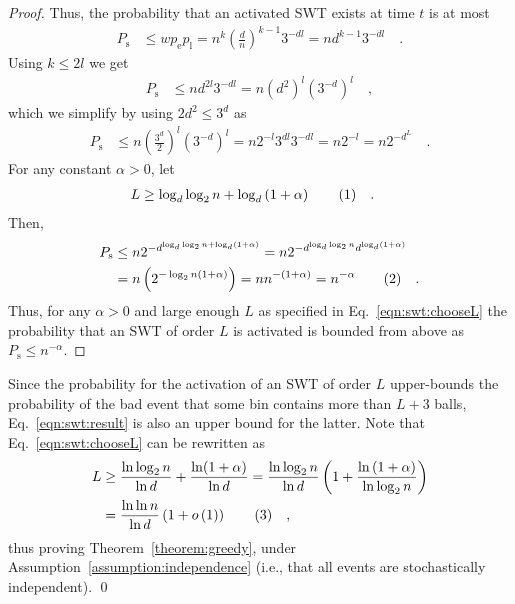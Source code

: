 \documentclass[a4paper,12pt]{article}
\newcommand\numberthis{\addtocounter{equation}{1}\tag{\theequation}}
\newcommand\neqn[1]{\numberthis\label{eqn:#1}}
\begin{document}
\begin{proof}
Thus, the probability that an activated SWT exists at time $t$ is at most 
\begin{align*}
P_\mathrm{s} &\leq w  p_\mathrm{e}  p_\mathrm{l} 
		= n^{k}  \left(\frac{d}{n}\right)^{k-1}  3^{-d  l} 
		= n  d^{k-1}  3^{-d  l}\quad .
\end{align*}
Using $k \leq 2l$ we get
\begin{align*}
P_\mathrm{s} &\leq n  d^{2 l}  3^{-d  l} 
		= n  \left(d^2\right)^l  \left( 3^{-d} \right)^l\quad ,
\end{align*}
which we simplify by using $2d^2 \leq 3^d$ as
\begin{align*}
P_\mathrm{s} &\leq n  \left(\frac{3^d}{2}\right)^l  \left( 3^{-d}\right)^l 
		= n  2^{-l}  3^{d l}  3^{-d  l} 
		= n 2^{-l}		
		= n 2^{-d^L} \quad .		
\end{align*}
For any constant $\alpha > 0 $, let
\begin{align*}
L &\geq \log_d\log_2 n + \log_d\left(1+\alpha\right) \neqn{swt:chooseL} \quad .
\end{align*}
Then, 
\begin{align*}
P_\mathrm{s} &\leq n  2^{{-d}^{\log_d\log_2 n + \log_d\left(1+\alpha\right)}} 
		= n  2^{-{d}^{\log_d\log_2 n} d^{\log_d \left(1+\alpha\right)}} \\
		&= n  \left( 2^{-\log_2 n  \left(1+ \alpha \right)} \right) 
		= n  n^{-\left(1+\alpha\right)} = n^{-\alpha} \neqn{swt:result}\quad .
\end{align*}
Thus, for any $\alpha>0$ and large enough $L$ as specified in Eq.~\ref{eqn:swt:chooseL} the probability that an SWT of order $L$ is activated is bounded from above as $P_\mathrm{s}\leq n^{-\alpha}$.
\end{proof}

Since the probability for the activation of an SWT of order $L$ upper-bounds the probability of the bad event that some bin contains more than $L+3$ balls, Eq.~\ref{eqn:swt:result} is also an upper bound for the latter. Note that Eq.~\ref{eqn:swt:chooseL} can be rewritten as
\begin{align*}
L &\geq  \frac{\ln\log_2 n}{\ln d} + \frac{\ln(1+\alpha)}{\ln d} 
   = \frac{\ln \log_2 n}{\ln d}  \left(1 + \frac{\ln\left(1+\alpha\right)}{\ln \log_2 n}\right) \\
  &=  \frac{\ln \ln n}{\ln d}  \left( 1+ o\left( 1\right)\right) \neqn{swt:boundL} \quad ,
\end{align*}
thus proving Theorem~\ref{theorem:greedy}, under Assumption~\ref{assumption:independence} (i.e., that all events are stochastically independent). \qed
\end{document}
